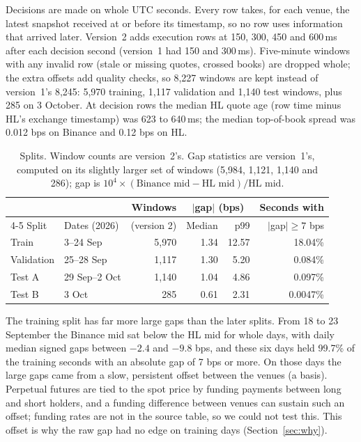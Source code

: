 \documentclass[12pt,a4paper]{article}
\DeclareRobustCommand{\bps}{\ifmmode\,\text{bps}\else\,bps\fi}
\begin{document}
Decisions are made on whole UTC seconds. Every row takes, for each venue, the latest snapshot
received at or before its timestamp, so no row uses information that arrived later. Version~2
adds execution rows at 150, 300, 450 and 600\,ms after each decision second (version~1 had 150
and 300\,ms). Five-minute windows with any invalid row (stale or missing quotes, crossed
books) are dropped whole; the extra offsets add quality checks, so 8,227 windows are kept
instead of version~1's 8,245: 5,970 training, 1,117 validation and 1,140 test windows, plus
285 on 3 October. At decision rows the median HL quote age (row time minus HL's exchange
timestamp) was 623 to 640\,ms; the median top-of-book spread was 0.012\bps{} on Binance and
0.12\bps{} on HL.

\begin{table}[!htbp]
\centering
\caption{Splits. Window counts are version~2's. Gap statistics are version~1's, computed on
its slightly larger set of windows (5,984, 1,121, 1,140 and 286); gap is
$10^4\times(\text{Binance mid} - \text{HL mid})/\text{HL mid}$.}
\label{tab:data}
\small
\begin{tabular}{@{}llrrrr@{}}
\toprule
 & & Windows & \multicolumn{2}{c}{$|$gap$|$ (bps)} & Seconds with \\
\cmidrule(lr){4-5}
Split & Dates (2026) & (version 2) & Median & p99 & $|$gap$|\geq 7$\bps{} \\
\midrule
Train      & 3--24 Sep     & 5,970 & 1.34 & 12.57 & 18.04\% \\
Validation & 25--28 Sep    & 1,117 & 1.30 &  5.20 & 0.084\% \\
Test A     & 29 Sep--2 Oct & 1,140 & 1.04 &  4.86 & 0.097\% \\
Test B     & 3 Oct         &   285 & 0.61 &  2.31 & 0.0047\% \\
\bottomrule
\end{tabular}
\end{table}

The training split has far more large gaps than the later splits. From 18 to 23 September
the Binance mid sat below the HL mid for whole days, with daily median signed gaps between
$-2.4$ and $-9.8$\bps, and these six days held 99.7\% of the training seconds with an
absolute gap of 7\bps{} or more. On those days the large gaps came from a slow, persistent
offset between the venues (a basis). Perpetual futures are tied to the spot price by
funding payments between long and short holders, and a funding difference between venues can
sustain such an offset; funding rates are not in the source table, so we could not test this.
This offset is why the raw gap had no edge on training days (Section~\ref{sec:why}).
\end{document}
